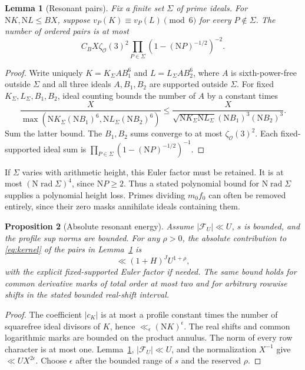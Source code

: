 \documentclass[11pt]{article}
\newtheorem{lemma}{Lemma}
\newtheorem{proposition}[lemma]{Proposition}
\newcommand{\N}{\mathrm N}
\newcommand{\OO}{\mathcal O}
\newcommand{\rad}{\operatorname{rad}}
\begin{document}
\begin{lemma}[Resonant pairs]\label{lem:resonant-count}
Fix a finite set $\Sigma$ of prime ideals. For $\N K,\N L\le BX$,
suppose $v_P(K)\equiv v_P(L)\pmod6$ for every $P\notin\Sigma$.
The number of ordered pairs is at most
\[
 C_B X\zeta_{\OO}(3)^2
       \prod_{P\in\Sigma}(1-(\N P)^{-1/2})^{-2}.
\]
\end{lemma}
\begin{proof}
Write uniquely $K=K_\Sigma A B_1^6$ and $L=L_\Sigma A B_2^6$,
where $A$ is sixth-power-free outside $\Sigma$ and all three ideals
$A,B_1,B_2$ are supported outside $\Sigma$.
For fixed $K_\Sigma,L_\Sigma,B_1,B_2$, ideal counting bounds the number
of $A$ by a constant times
\[
 \frac{X}{\max(\N K_\Sigma(\N B_1)^6,\N L_\Sigma(\N B_2)^6)}
 \le\frac{X}{\sqrt{\N K_\Sigma\N L_\Sigma}(\N B_1)^3(\N B_2)^3}.
\]
Sum the latter bound. The $B_1,B_2$ sums converge to at most
$\zeta_{\OO}(3)^2$. Each fixed-supported ideal sum is
$\prod_{P\in\Sigma}(1-(\N P)^{-1/2})^{-1}$.
\end{proof}

If $\Sigma$ varies with arithmetic height, this Euler factor must be
retained. It is at most $(\N\rad\Sigma)^4$, since $\N P\ge2$.
Thus a stated polynomial bound for $\N\rad\Sigma$ supplies a polynomial
height loss. Primes dividing $m_0f_0$ can often be removed entirely,
since their zero masks annihilate ideals containing them.

\begin{proposition}[Absolute resonant energy]\label{prop:resonant-energy}
Assume $|\mathcal F_U|\ll U$, $s$ is bounded, and the profile sup norms
are bounded. For any $\rho>0$, the absolute contribution to
\eqref{eq:kernel} of the pairs in Lemma~\ref{lem:resonant-count} is
\[
 \ll (1+H)^J U^{1+\rho},
\]
with the explicit fixed-supported Euler factor if needed.
The same bound holds for common derivative marks of total order at most two
and for arbitrary rowwise shifts in the stated bounded real-shift interval.
\end{proposition}
\begin{proof}
The coefficient $|c_K|$ is at most a profile constant times the number
of squarefree ideal divisors of $K$, hence $\ll_\epsilon(\N K)^\epsilon$.
The real shifts and common logarithmic marks are bounded on the product
annulus. The norm of every row character is at most one.
Lemma~\ref{lem:resonant-count}, $|\mathcal F_U|\ll U$, and the
normalization $X^{-1}$ give $\ll U X^{2\epsilon}$.
Choose $\epsilon$ after the bounded range of $s$ and the reserved $\rho$.
\end{proof}
\end{document}
